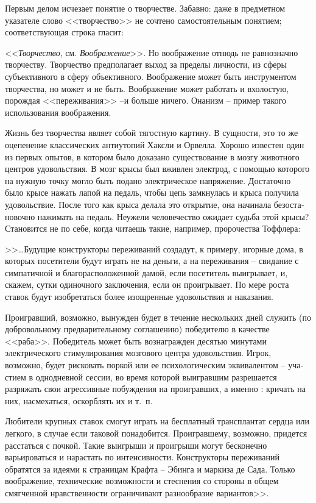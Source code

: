 \documentclass{book}
\begin{document}
Первым делом исчезает понятие о творчестве. Забавно: да­же в предметном указателе слово <<творчество>> не сочтено са­мостоятельным понятием; соответствующая строка гласит:

<<\textit{Творчество},  см. \textit{Воображение}>>.  Но воображение отнюдь не равнозначно творчеству. Творчество предполагает выход за пределы личности, из сферы субъективного в сферу объективного. Воображение может быть инструментом творчества, но может и не быть. Воображение может работать и вхолостую, порож­дая <<переживания>> --и больше ничего. Онанизм -- пример та­кого использования воображения.

Жизнь без творчества являет собой тягостную картину. В сущ­ности, это то же оцепенение классических антиутопий Хаксли и Орвелла. Хорошо известен один из первых опытов, в котором было доказано существование в мозгу животного центров удо­вольствия. В мозг крысы был вживлен электрод, с помощью которого на нужную точку могло быть подано электрическое напряжение. Достаточно было крысе нажать лапой на педаль, чтобы цепь замкнулась и крыса получила удовольствие. Пос­ле того как крыса делала это открытие, она начинала безоста­новочно нажимать на педаль. Неужели человечество ожидает судьба этой крысы? Становится не по себе, когда читаешь такие, например, пророчества Тоффлера:

>>\ldots Будущие конструкторы переживаний создадут, к приме­ру, игорные дома, в которых посетители будут играть не на деньги, а на переживания -- свидание с симпатичной и благо­расположенной дамой, если посетитель выигрывает, и, скажем, сутки одиночного заключения, если он проигрывает. По мере роста ставок будут изобретаться более изощренные удовольст­вия и наказания.

Проигравший, возможно, вынужден будет в течение несколь­ких дней служить (по добровольному предварительному согла­шению) победителю в качестве <<раба>>. Победитель может быть вознагражден десятью минутами электрического стимулирова­ния мозгового центра удовольствия. Игрок, возможно, будет рисковать поркой или ее психологическим эквивалентом -- уча­стием в однодневной сессии, во время которой выигравшим разрешается разряжать свои агрессивные побуждения на проиг­равших, а именно : кричать на них, насмехаться, оскорблять их и т.~п.

Любители крупных ставок смогут играть на бесплатный трансплантат сердца или легкого, в случае если таковой пона­добится. Проигравшему, возможно, придется расстаться с поч­кой. Такие выигрыши и проигрыши могут бесконечно варьироваться и нарастать по интенсивности. Конструкторы пережи­ваний обратятся за идеями к страницам Крафта -- Эбинга и мар­киза де Сада. Только воображение, технические возможности и стеснения со стороны в общем смягченной нравственности ограничивают разнообразие вариантов>>.%
\end{document}
